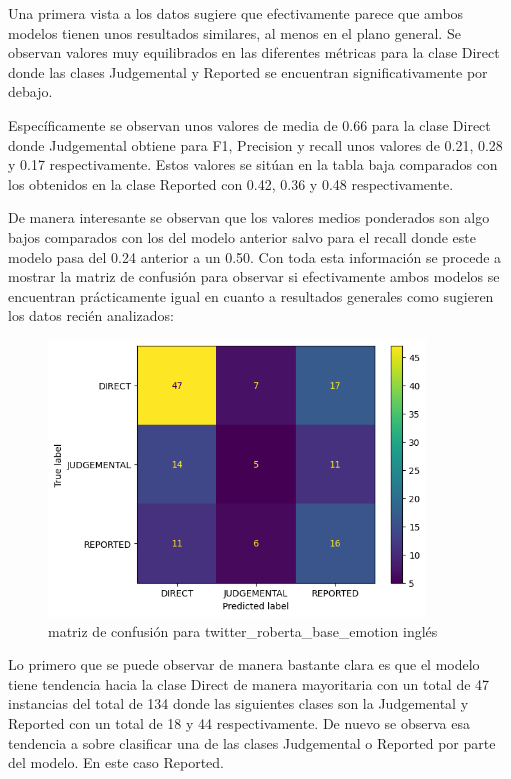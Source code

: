 Una primera vista a los datos sugiere que efectivamente parece que ambos modelos tienen unos resultados similares, al menos en el plano general. Se observan valores muy equilibrados en las diferentes métricas para la clase Direct donde las clases Judgemental y Reported se encuentran significativamente por debajo.

Específicamente se observan unos valores de media de 0.66 para la clase Direct donde Judgemental obtiene para F1, Precision y recall unos valores de 0.21, 0.28 y 0.17 respectivamente. Estos valores se sitúan en la tabla baja comparados con los obtenidos en la clase Reported con 0.42, 0.36 y 0.48 respectivamente.

De manera interesante se observan que los valores medios ponderados son algo bajos comparados con los del modelo anterior salvo para el recall donde este modelo pasa del 0.24 anterior a un 0.50. Con toda esta información se procede a mostrar la matriz de confusión para observar si efectivamente ambos modelos se encuentran prácticamente igual en cuanto a resultados generales como sugieren los datos recién analizados:




\begin{figure}[H]
    \centering
    \includegraphics[width=10cm]{imagenes/Evaluacion/confusion_matrix/twitter_roberta_base_emotion-english-dirty_task2.png}
    \caption{\centering matriz de confusión para twitter\_roberta\_base\_emotion inglés}
\end{figure}

Lo primero que se puede observar de manera bastante clara es que el modelo tiene tendencia hacia la clase Direct de manera mayoritaria con un total de 47 instancias del total de 134 donde las siguientes clases son la Judgemental y Reported con un total de 18 y 44 respectivamente. De nuevo se observa esa tendencia a sobre clasificar una de las clases Judgemental o Reported por parte del modelo. En este caso Reported.

